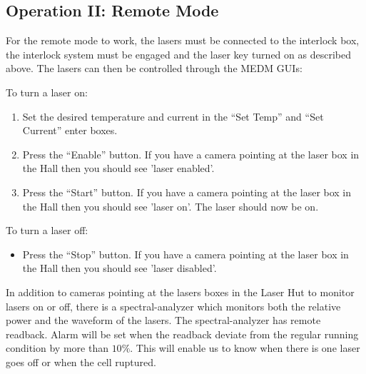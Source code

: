 {%
\subsection{Operation II: Remote Mode}

For the remote mode to work, 
the lasers must be connected to the interlock box,
the interlock system must be engaged and
the laser key turned on as described above. The lasers can then 
be controlled through the MEDM GUIs:

To turn a laser on:
\begin{enumerate} \setlength{\parskip}{0ex}
\item Set the desired temperature and current in the ``Set Temp'' 
and ``Set Current'' enter boxes.
\item Press the ``Enable'' button.  If you have a camera pointing
at the laser box in the Hall then you should see 'laser enabled'.
\item Press the ``Start'' button.  If you have a camera pointing
at the laser box in the Hall then you should see 'laser on'.  The
laser should now be on.
\end{enumerate}
To turn a laser off:
\begin{itemize}
\item Press the ``Stop'' button.  If you have a camera pointing
at the laser box in the Hall then you should see 'laser disabled'.
\end{itemize}

In addition to cameras pointing at the lasers boxes in the Laser Hut to 
monitor lasers on or off, there is a spectral-analyzer which monitors
both the relative power and the waveform of the lasers. The spectral-analyzer 
has remote readback.  Alarm will be set when the readback deviate
from the regular running condition by more than $10\%$. This will enable us 
to know when there is one laser goes off or when the cell ruptured.

} %
